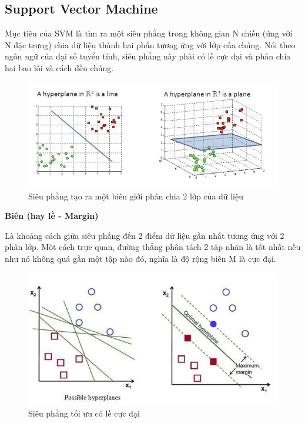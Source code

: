 \documentclass[12pt,a4paper,oneside]{book}
\begin{document}
		\subsection{Support Vector Machine}
		Mục tiêu của SVM là tìm ra một siêu phẳng trong không gian N chiều (ứng với N đặc trưng) chia dữ liệu thành hai phần tương ứng với lớp của chúng. Nói theo ngôn ngữ của đại số tuyển tính, siêu phẳng này phải có lề cực đại và phân chia hai bao lồi và cách đều chúng.
		
			\begin{figure}[H]
			\begin{center}
		\includegraphics[width=0.8\columnwidth]{SVM_hyperplane}
			\end{center}
		\caption{Siêu phẳng tạo ra một biên giới phân chia 2 lớp của dữ liệu}
			\end{figure}		
		
		\textbf{Biên (hay lề - Margin)}
		
		Là khoảng cách giữa siêu phẳng đến 2 điểm dữ liệu gần	nhất tương ứng với 2 phân lớp. Một cách trực quan, đường thẳng phân tách 2 tập nhãn là tốt nhất nếu như nó không quá gần một tập nào đó, nghĩa là độ rộng biên M là cực đại.
		
			\begin{figure}[H]
			\begin{center}
				\includegraphics[width=0.8\columnwidth]{SVM_maxmargin}
			\end{center}
			\caption{Siêu phẳng tối ưu có lề cực đại}
			\end{figure}
		
\end{document}
